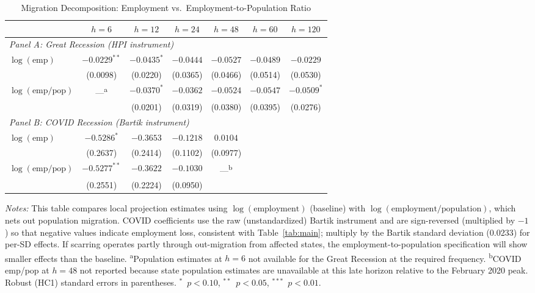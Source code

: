 \documentclass[12pt]{article}
\begin{document}
\begin{table}[H]
\centering
\caption{Migration Decomposition: Employment vs.\ Employment-to-Population Ratio}
\begin{threeparttable}
\small
\begin{tabular}{lcccccc}
\toprule
& $h=6$ & $h=12$ & $h=24$ & $h=48$ & $h=60$ & $h=120$ \\
\midrule
\multicolumn{7}{l}{\textit{Panel A: Great Recession (HPI instrument)}} \\[3pt]
$\log(\text{emp})$ & $-0.0229^{**}$ & $-0.0435^{*}$ & $-0.0444$ & $-0.0527$ & $-0.0489$ & $-0.0229$ \\
& (0.0098) & (0.0220) & (0.0365) & (0.0466) & (0.0514) & (0.0530) \\[3pt]
$\log(\text{emp/pop})$ & ---\textsuperscript{a} & $-0.0370^{*}$ & $-0.0362$ & $-0.0524$ & $-0.0547$ & $-0.0509^{*}$ \\
& & (0.0201) & (0.0319) & (0.0380) & (0.0395) & (0.0276) \\
\midrule
\multicolumn{7}{l}{\textit{Panel B: COVID Recession (Bartik instrument)}} \\[3pt]
$\log(\text{emp})$ & $-0.5286^{*}$ & $-0.3653$ & $-0.1218$ & $0.0104$ & & \\
& (0.2637) & (0.2414) & (0.1102) & (0.0977) & & \\[3pt]
$\log(\text{emp/pop})$ & $-0.5277^{**}$ & $-0.3622$ & $-0.1030$ & ---\textsuperscript{b} & & \\
& (0.2551) & (0.2224) & (0.0950) & & & \\
\bottomrule
\end{tabular}
\begin{tablenotes}[flushleft]
\small
\item \textit{Notes:} This table compares local projection estimates using $\log(\text{employment})$ (baseline) with $\log(\text{employment/population})$, which nets out population migration. COVID coefficients use the raw (unstandardized) Bartik instrument and are sign-reversed (multiplied by $-1$) so that negative values indicate employment loss, consistent with Table~\ref{tab:main}; multiply by the Bartik standard deviation (0.0233) for per-SD effects. If scarring operates partly through out-migration from affected states, the employment-to-population specification will show smaller effects than the baseline. \textsuperscript{a}Population estimates at $h=6$ not available for the Great Recession at the required frequency. \textsuperscript{b}COVID emp/pop at $h=48$ not reported because state population estimates are unavailable at this late horizon relative to the February 2020 peak. Robust (HC1) standard errors in parentheses. $^{*}$~$p<0.10$, $^{**}$~$p<0.05$, $^{***}$~$p<0.01$.
\end{tablenotes}
\end{threeparttable}
\label{tab:migration}
\end{table}
\end{document}
